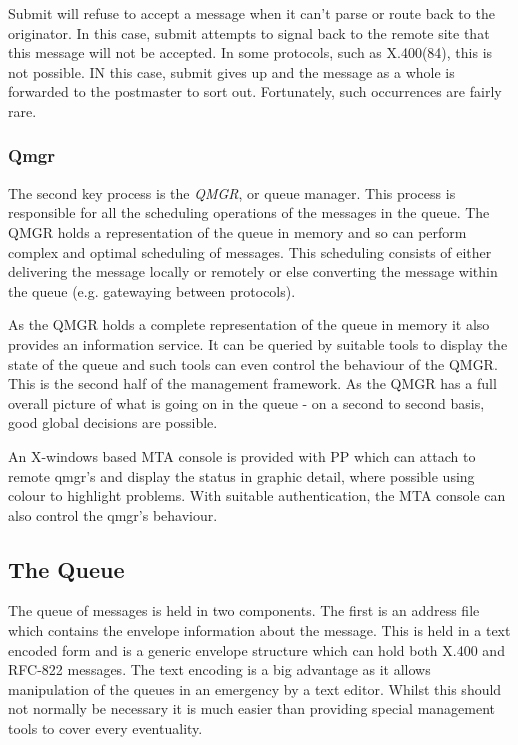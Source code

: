 Submit will refuse to accept a message when it can't parse or route
back to the originator. In this case, submit attempts to signal back
to the remote site that this message will not be accepted. In some
protocols, such as X.400(84), this is not possible. IN this case,
submit gives up and the message as a whole is forwarded to the
postmaster to sort out. Fortunately, such occurrences are fairly rare.

\subsubsection{Qmgr}
The second key process is the {\em QMGR}, or queue manager. This
process is responsible for all the scheduling operations of the
messages in the queue. The QMGR holds a representation of the queue in
memory and so can perform complex and optimal scheduling of messages.
This scheduling consists of either delivering the message locally or
remotely or else converting the message within the queue (e.g.
gatewaying between protocols).

As the QMGR holds a complete representation of the queue in memory it
also provides an information service. It can be queried by suitable
tools to display the state of the queue and such tools can even
control the behaviour of the QMGR. This is the second half of the
management framework. As the QMGR has a full overall picture of what
is going on in the queue - on a second to second basis, good global
decisions are possible.

An X-windows based MTA console is provided with PP which can attach
to remote qmgr's and display the status in graphic detail, where
possible using colour to highlight problems. With suitable
authentication, the MTA console can also control the qmgr's behaviour.

\subsection{The Queue}

The queue of messages is held in two components. The first is an
address file which contains the envelope information about the
message. This is held in a text encoded form and is a generic envelope
structure which can hold both X.400 and RFC-822 messages. The text
encoding is a big advantage as it allows manipulation of the queues in
an emergency by a text editor. Whilst this should not normally be
necessary it is much easier than providing special management tools
to cover every eventuality.

